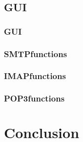 \documentclass[11pt]{article}
\begin{document}
\begin{multicols}{2}
\subsection{GUI}
\subsubsection{GUI}

\subsubsection{SMTPfunctions}

\subsubsection{IMAPfunctions}

\subsubsection{POP3functions}

\section{Conclusion}

\end{multicols}
\newpage
\begin{thebibliography}{9}

\end{thebibliography}
\newpage
\appendix
\end{document}
